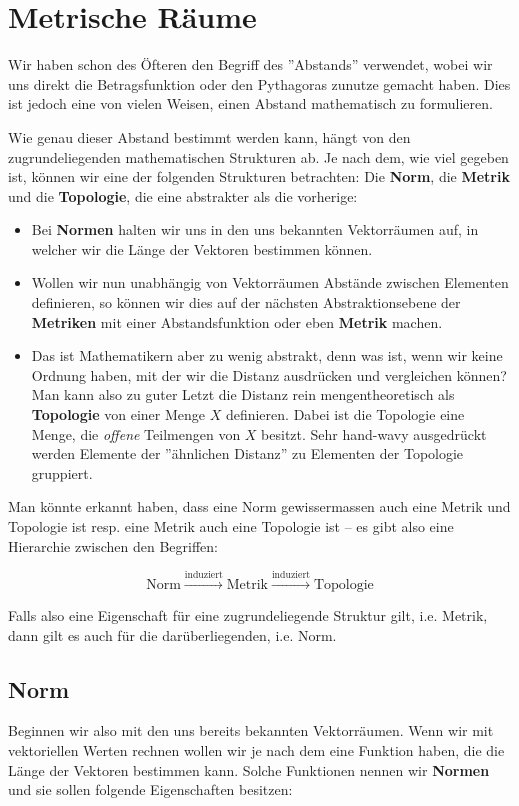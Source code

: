 \setcounter{chapter}{8}
\chapter{Metrische Räume}
Wir haben schon des Öfteren den Begriff des ''Abstands'' verwendet, wobei wir uns direkt die Betragsfunktion oder den Pythagoras zunutze gemacht haben. Dies ist jedoch eine von vielen Weisen, einen Abstand mathematisch zu formulieren. 

Wie genau dieser Abstand bestimmt werden kann, hängt von den zugrundeliegenden mathematischen Strukturen ab. Je nach dem, wie viel gegeben ist, können wir eine der folgenden Strukturen betrachten: Die \textbf{Norm}, die \textbf{Metrik} und die \textbf{Topologie}, die eine abstrakter als die vorherige:

\begin{itemize}
    \item Bei \textbf{Normen} halten wir uns in den uns bekannten Vektorräumen auf, in welcher wir die Länge der Vektoren bestimmen können.
    \item Wollen wir nun unabhängig von Vektorräumen Abstände zwischen Elementen definieren, so können wir dies auf der nächsten Abstraktionsebene der \textbf{Metriken} mit einer Abstandsfunktion oder eben \textbf{Metrik} machen.
    \item Das ist Mathematikern aber zu wenig abstrakt, denn was ist, wenn wir keine Ordnung haben, mit der wir die Distanz ausdrücken und vergleichen können? Man kann also zu guter Letzt die Distanz rein mengentheoretisch als \textbf{Topologie} von einer Menge $X$ definieren. Dabei ist die Topologie eine Menge, die \textit{offene} Teilmengen von $X$ besitzt. Sehr hand-wavy ausgedrückt werden Elemente der ''ähnlichen Distanz'' zu Elementen der Topologie gruppiert.
\end{itemize}

Man könnte erkannt haben, dass eine Norm gewissermassen auch eine Metrik und Topologie ist resp. eine Metrik auch eine Topologie ist -- es gibt also eine Hierarchie zwischen den Begriffen:

$$\text{Norm} \xrightarrow{\text{induziert}}\text{Metrik} \xrightarrow{\text{induziert}}\text{Topologie}$$

Falls also eine Eigenschaft für eine zugrundeliegende Struktur gilt, i.e. Metrik, dann gilt es auch für die darüberliegenden, i.e. Norm. 

\section{Norm}
Beginnen wir also mit den uns bereits bekannten Vektorräumen. Wenn wir mit vektoriellen Werten rechnen wollen wir je nach dem eine Funktion haben, die die Länge der Vektoren bestimmen kann. Solche Funktionen nennen wir \textbf{Normen} und sie sollen folgende Eigenschaften besitzen:

